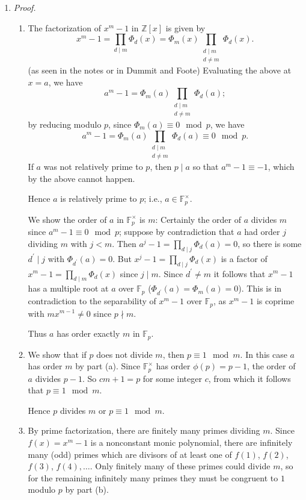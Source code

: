 \documentclass[11pt]{article}
\begin{document}
\begin{enumerate}
    \item \textit{Proof.}
    \begin{enumerate}
        \item The factorization of $x^m-1$ in $\mathbb{Z}[x]$ is given by \[x^m-1 = \prod_{d\mid m}\Phi_d(x) = \Phi_m(x)\prod_{\substack{d\mid m \\ d\neq m}}\Phi_d(x).\] (as seen in the notes or in Dummit and Foote) Evaluating the above at $x = a$, we have \[a^m-1 = \Phi_m(a)\prod_{\substack{d\mid m \\ d\neq m}}\Phi_d(a);\] by reducing modulo $p$, since $\Phi_m(a)\equiv 0 \mod p$, we have \[a^m-1 = \Phi_m(a)\prod_{\substack{d\mid m \\ d\neq m}}\Phi_d(a)\equiv 0\mod p.\] If $a$ was not relatively prime to $p$, then $p\mid a$ so that $a^m-1\equiv -1$, which by the above cannot happen.
        
        Hence $a$ is relatively prime to $p$; i.e., $a\in \mathbb{F}_p^\times$.
        
        We show the order of $a$ in $\mathbb{F}_p^\times$ is $m$: Certainly the order of $a$ divides $m$ since $a^m-1\equiv 0\mod p$; suppose by contradiction that $a$ had order $j$ dividing $m$ with $j<m$. Then $a^j-1 = \prod_{d\mid j}\Phi_d(a) = 0$, so there is some $d^\prime\mid j$ with $\Phi_{d^\prime}(a) = 0$. But $x^j-1 = \prod_{d\mid j}\Phi_d(x)$ is a factor of $x^m-1 = \prod_{d\mid m}\Phi_d(x)$ since $j\mid m$. Since $d^\prime\neq m$ it follows that $x^m-1$ has a multiple root at $a$ over $\mathbb{F}_p$ ($\Phi_{d^\prime}(a) = \Phi_{m}(a) = 0$). This is in contradiction to the separability of $x^m-1$ over $\mathbb{F}_p$, as $x^m-1$ is coprime with $mx^{m-1}\neq 0$ since $p\nmid m$.
        
        Thus $a$ has order exactly $m$ in $\mathbb{F}_p$.
        \item We show that if $p$ does not divide $m$, then $p\equiv 1 \mod m$. In this case $a$ has order $m$ by part (a). Since $\mathbb{F}_p^\times$ has order $\phi(p) = p-1 $, the order of $a$ divides $p-1$. So $cm+1 = p$ for some integer $c$, from which it follows that $p \equiv 1\mod m$.
        
        Hence $p$ divides $m$ or $p\equiv 1\mod m$.
        \item By prime factorization, there are finitely many primes dividing $m$. Since $f(x) = x^m-1$ is a nonconstant monic polynomial, there are infinitely many (odd) primes which are divisors of at least one of $f(1)$, $f(2)$, $f(3)$, $f(4),\dots$. Only finitely many of these primes could divide $m$, so for the remaining infinitely many primes they must be congruent to $1$ modulo $p$ by part (b).
        

\end{enumerate}
\end{enumerate}
\end{document}

